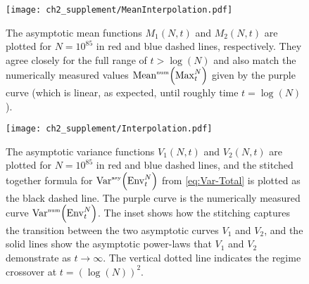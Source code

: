 \begin{figure}[h]
\begin{center}
 \texttt{[image: ch2\_supplement/MeanInterpolation.pdf]}
 \caption{The asymptotic mean functions $M_1(N,t)$ and $M_2(N,t)$ are plotted for $N=10^{85}$ in red and blue dashed lines, respectively. They agree closely for the full range of $t>\log(N)$ and also match the numerically measured values $\mathrm{Mean}^{\textrm{\tiny{num}}}\!\left(\mathrm{Max}^{N}_t\right)$ given by the purple curve (which is linear, as expected, until roughly time $t=\log(N)$).}
 \label{fig:MeanInterpolation}
\end{center}
\end{figure}

\begin{figure}[h]
\begin{center}
 \texttt{[image: ch2\_supplement/Interpolation.pdf]}
 \caption{The asymptotic variance functions $V_1(N,t)$ and $V_2(N,t)$ are plotted for $N=10^{85}$ in red and blue dashed lines, and the stitched together formula for $\mathrm{Var}^{\textrm{\tiny{asy}}}\!\left(\mathrm{Env}^{N}_t\right)$ from \eqref{eq:Var-Total} is plotted as the black dashed line. The purple curve is the numerically measured curve  $\mathrm{Var}^{\textrm{\tiny{num}}}\!\left(\mathrm{Env}^{N}_t\right)$. The inset shows how the stitching captures the transition between the two asymptotic curves $V_1$ and $V_2$, and the solid lines show the asymptotic power-laws that $V_1$ and $V_2$ demonstrate as $t\to\infty$. The vertical dotted line indicates the regime crossover at $t=(\log(N))^2$.}
 \label{fig:Interpolation}
\end{center}
\end{figure}

